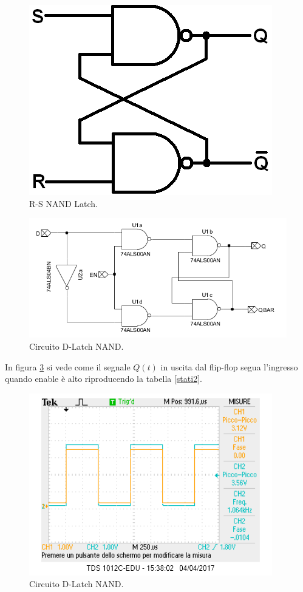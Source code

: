 \documentclass[10pt,a4paper]{article}
\begin{document}
\begin{figure}
\centering
\includegraphics[scale=0.5]{latchNand.png}
\caption{R-S NAND Latch.\label{latch}}
\end{figure}

\begin{figure}
\centering
\includegraphics[scale=0.7]{flipflopDlatch.png}
\caption{Circuito  D-Latch NAND.\label{circuito}}
\end{figure}

In figura \ref{segue} si vede come il segnale $Q(t)$ in uscita dal flip-flop segua l'ingresso quando enable è alto riproducendo la tabella \ref{stati2}.\\

\begin{figure}
\centering
\includegraphics[scale=1.0]{FFD1in2Q.png}
\caption{Circuito  D-Latch NAND.\label{segue}}
\end{figure}
\end{document}
